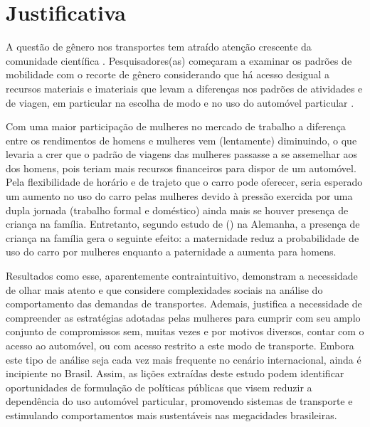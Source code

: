 \section{Justificativa}

A questão de gênero nos transportes tem atraído atenção crescente da comunidade científica \cite{ROSENBLOOM1978,HANSON1985,ROSENBLOOM2006,UTENG2008,HANSON2010}.
Pesquisadores(as) começaram a examinar os padrões de mobilidade com o recorte de gênero considerando que há acesso desigual a recursos materiais e imateriais \cite{HOWE1982,HANSON1995,ELMHIRST2003,RAJU2005} que levam a diferenças nos padrões de atividades e de viagen\cite{FAGNANI1983,LAFFERTY1991,LAFFERTY1992,IBIPO1992,ROOT1999,SCHWANEN2002,SONG2003,
MCNUCKIN2005,CRANE2007,VASCONCELLOS2012}, em particular na escolha de modo e no uso do automóvel particular \cite{FOX1983,HJORTHOL2000,POLK2003,BEST2005}.

Com uma maior participação de mulheres no mercado de trabalho a diferença entre os rendimentos de homens e mulheres vem (lentamente) diminuindo, o que levaria a crer que o padrão de viagens das mulheres passasse a se assemelhar aos dos homens, pois teriam mais recursos financeiros para dispor de um automóvel. Pela flexibilidade de horário e de trajeto que o carro pode oferecer, seria esperado um aumento no uso do carro pelas mulheres devido à pressão exercida por uma dupla jornada (trabalho formal e doméstico) ainda mais se houver presença de criança na família. Entretanto, segundo estudo de   (\citeyear{BEST2005}) na Alemanha, a presença de criança na família gera o seguinte efeito: a maternidade reduz a probabilidade de uso do carro por mulheres enquanto a paternidade a aumenta para homens.

Resultados como esse, aparentemente contraintuitivo, demonstram a necessidade de olhar mais atento e que considere complexidades sociais na análise do comportamento das demandas de transportes. Ademais, justifica a necessidade de compreender as estratégias adotadas pelas mulheres para cumprir com seu amplo conjunto de compromissos sem, muitas vezes e por motivos diversos, contar com o acesso ao automóvel, ou com acesso restrito a este modo de transporte.
Embora este tipo de análise seja cada vez mais frequente no cenário internacional, ainda é incipiente no Brasil. Assim, as lições extraídas deste estudo podem identificar oportunidades de formulação de políticas públicas que visem reduzir a dependência do uso automóvel particular, promovendo sistemas de transporte e estimulando comportamentos mais sustentáveis nas megacidades brasileiras.

